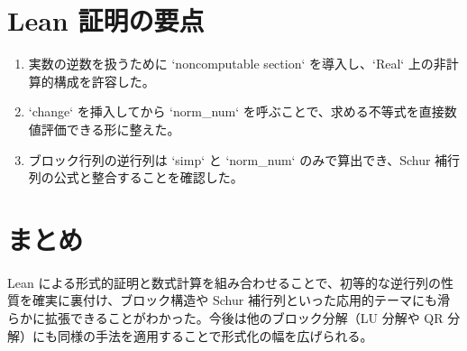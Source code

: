 \documentclass[12pt]{ltjsarticle}
\begin{document}
\section{Lean 証明の要点}
\begin{enumerate}
  \item 実数の逆数を扱うために `noncomputable section` を導入し、`Real` 上の非計算的構成を許容した。
  \item `change` を挿入してから `norm_num` を呼ぶことで、求める不等式を直接数値評価できる形に整えた。
  \item ブロック行列の逆行列は `simp` と `norm_num` のみで算出でき、Schur 補行列の公式と整合することを確認した。
\end{enumerate}

\section{まとめ}
Lean による形式的証明と数式計算を組み合わせることで、初等的な逆行列の性質を確実に裏付け、ブロック構造や Schur 補行列といった応用的テーマにも滑らかに拡張できることがわかった。今後は他のブロック分解（LU 分解や QR 分解）にも同様の手法を適用することで形式化の幅を広げられる。
\end{document}
